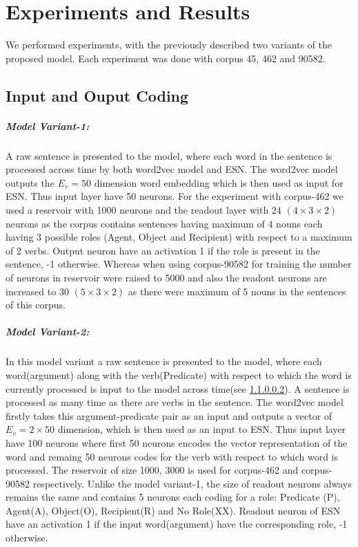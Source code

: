 \chapter{Experiments and Results}\label{results}

We performed experiments, with the previously described two variants of the proposed model. Each experiment was done with corpus 45, 462 and 90582.

\section{Input and Ouput Coding}

\paragraph{Model Variant-1:} A raw sentence is presented to the model, where each word in the sentence is processed across time by both word2vec model and ESN. The word2vec model outputs the $E_{v}=50$ dimension word embedding which is then used as input for ESN. Thus input layer have 50 neurons. For the experiment with corpus-462 we used a reservoir with 1000 neurons and the readout layer with 24 $(4 \times 3 \times 2)$ neurons as the corpus contains sentences having maximum of 4 nouns each having 3 possible roles (Agent, Object and Recipient) with respect to a maximum of 2 verbs. Output neuron have an activation 1 if the role is present in the sentence, -1 otherwise. Whereas when using corpus-90582 for training the number of neurons in reservoir were raised to 5000 and also the  readout neurons are increased to 30 $(5 \times 3 \times 2)$ as there were maximum of 5 nouns in the sentences of this corpus.

\paragraph{Model Variant-2:} In this model variant a raw sentence is presented to the model, where each word(argument) along with the verb(Predicate) with respect to which the word is currently processed is input to the model across time(see \ref{}). A sentence is processed as many time as there are verbs in the sentence. The word2vec model firstly takes this argument-predicate pair as an input and outputs a vector of $E_{v}=2 \times 50$ dimension, which is then used as an input to ESN. Thus input layer have 100 neurons where first 50 neurons encodes the vector representation of the word and remaing 50 neurons codes for the verb with respect to which word is processed. The reservoir of size 1000, 3000 is used for corpus-462 and corpus-90582 respectively. Unlike the model variant-1, the size of readout neurons always remains the same and contains 5 neurons each coding for a role: Predicate (P), Agent(A), Object(O), Recipient(R) and No Role(XX). Readout neuron of ESN have an activation 1 if the input word(argument) have the corresponding role, -1 otherwise.

